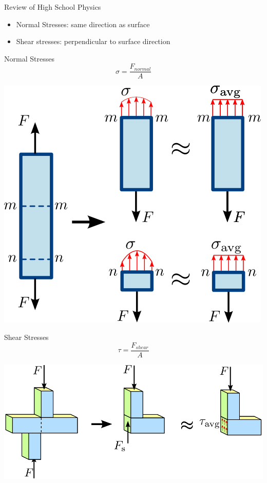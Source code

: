 \documentclass[10pt, svgnames]{beamer}
\begin{document}
\begin{frame}[label={sec:orgaa22efa}]{Review of High School Physics}
\begin{itemize}
\item Normal Stresses: same direction as surface

\item Shear stresses: perpendicular to surface direction
\end{itemize}
\end{frame}

\begin{frame}[label={sec:org04458e7}]{Normal Stresses}
\[\sigma = \frac{F_{normal}}{A}\]

\begin{center}
\includegraphics[height=0.7\textheight]{./pictures/normal-stress.png}
\end{center}
\end{frame}

\begin{frame}[label={sec:org5fba297}]{Shear Stresses}
\[\tau = \frac{F_{shear}}{A}\]

\includegraphics[width=\textwidth]{./pictures/shear-stress.png}
\end{frame}
\end{document}
